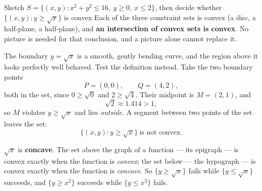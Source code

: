 \begin{worked}{Sketch $S=\{(x,y):x^{2}+y^{2}\le16,\ y\ge0,\ x\le2\}$, then decide whether $\{(x,y):y\ge\sqrt{x}\}$ is convex}
Each of the three constraint sets is convex (a disc, a half-plane, a
half-plane), and \textbf{an intersection of convex sets is convex}. No
picture is needed for that conclusion, and a picture alone cannot replace
it.

The boundary $y=\sqrt{x}$ is a smooth, gently bending curve, and the region
above it looks perfectly well behaved. Test the definition instead. Take the
two boundary points
\[
  P=(0,0),\qquad Q=(4,2),
\]
both in the set, since $0\ge\sqrt0$ and $2\ge\sqrt4$. Their midpoint is
$M=(2,1)$, and
\[
  \sqrt{2}\approx1.414>1 ,
\]
so $M$ violates $y\ge\sqrt{x}$ and lies \emph{outside}. A segment between
two points of the set leaves the set:
\[
  \boxed{\{(x,y):y\ge\sqrt{x}\}\ \text{is not convex.}}
\]

$\sqrt{x}$ is \textbf{concave}. The set above the graph of a function --- its
epigraph --- is convex exactly when the function is \emph{convex}; the set
below --- the hypograph --- is convex exactly when the function is
\emph{concave}. So $\{y\ge\sqrt{x}\}$ fails while $\{y\le\sqrt{x}\}$
succeeds, and $\{y\ge x^{2}\}$ succeeds while $\{y\le x^{2}\}$ fails.
\end{worked}

